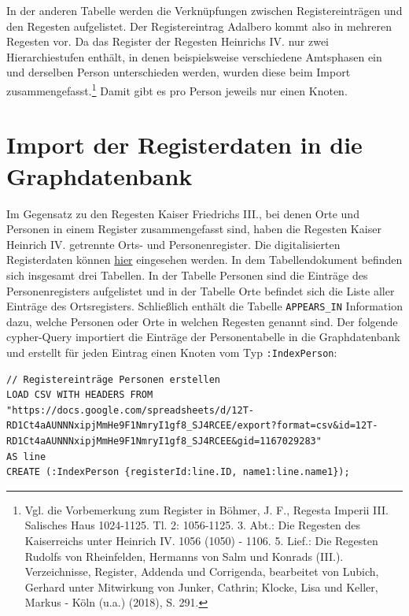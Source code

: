 \documentclass[ngerman,]{scrreprt}
\begin{document}
In der anderen Tabelle werden die Verknüpfungen zwischen Registereinträgen und den Regesten aufgelistet. Der Registereintrag Adalbero kommt also in mehreren Regesten vor. Da das Register der Regesten Heinrichs IV. nur zwei Hierarchiestufen enthält, in denen beispielsweise verschiedene Amtsphasen ein und derselben Person unterschieden werden, wurden diese beim Import zusammengefasst.\footnote{Vgl. die Vorbemerkung zum Register in Böhmer, J. F., Regesta Imperii III. Salisches Haus 1024-1125. Tl. 2: 1056-1125. 3. Abt.: Die Regesten des Kaiserreichs unter Heinrich IV. 1056 (1050) - 1106. 5. Lief.: Die Regesten Rudolfs von Rheinfelden, Hermanns von Salm und Konrads (III.). Verzeichnisse, Register, Addenda und Corrigenda, bearbeitet von Lubich, Gerhard unter Mitwirkung von Junker, Cathrin; Klocke, Lisa und Keller, Markus - Köln (u.a.) (2018), S. 291.} Damit gibt es pro Person jeweils nur einen Knoten.

\section{Import der Registerdaten in die Graphdatenbank}\label{import-der-registerdaten-in-die-graphdatenbank-1}

Im Gegensatz zu den Regesten Kaiser Friedrichs III., bei denen Orte und Personen in einem Register zusammengefasst sind, haben die Regesten Kaiser Heinrich IV. getrennte Orts- und Personenregister. Die digitalisierten Registerdaten können \href{https://docs.google.com/spreadsheets/d/12T-RD1Ct4aAUNNNxipjMmHe9F1NmryI1gf8_SJ4RCEE/edit?usp=sharing}{hier} eingesehen werden. In dem Tabellendokument befinden sich insgesamt drei Tabellen. In der Tabelle Personen sind die Einträge des Personenregisters aufgelistet und in der Tabelle Orte befindet sich die Liste aller Einträge des Ortsregisters. Schließlich enthält die Tabelle \texttt{APPEARS\_IN} Information dazu, welche Personen oder Orte in welchen Regesten genannt sind. Der folgende cypher-Query importiert die Einträge der Personentabelle in die Graphdatenbank und erstellt für jeden Eintrag einen Knoten vom Typ \texttt{:IndexPerson}:

\begin{verbatim}
// Registereinträge Personen erstellen
LOAD CSV WITH HEADERS FROM "https://docs.google.com/spreadsheets/d/12T-RD1Ct4aAUNNNxipjMmHe9F1NmryI1gf8_SJ4RCEE/export?format=csv&id=12T-RD1Ct4aAUNNNxipjMmHe9F1NmryI1gf8_SJ4RCEE&gid=1167029283"
AS line
CREATE (:IndexPerson {registerId:line.ID, name1:line.name1});
\end{verbatim}
\end{document}
